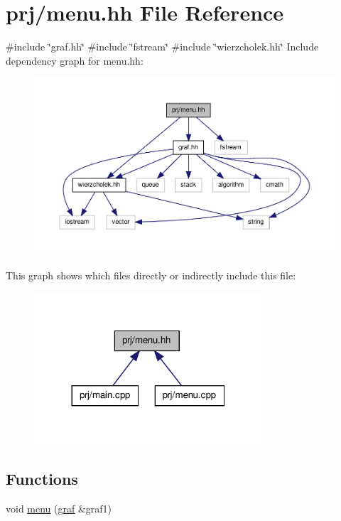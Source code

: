 \hypertarget{menu_8hh}{\section{prj/menu.hh \-File \-Reference}
\label{menu_8hh}
}
{\ttfamily \#include \char`\"{}graf.\-hh\char`\"{}}\*
{\ttfamily \#include \char`\"{}fstream\char`\"{}}\*
{\ttfamily \#include \char`\"{}wierzcholek.\-hh\char`\"{}}\*
\-Include dependency graph for menu.\-hh\-:\nopagebreak
\begin{figure}[H]
\begin{center}
\leavevmode
\includegraphics[width=350pt]{menu_8hh__incl}
\end{center}
\end{figure}
\-This graph shows which files directly or indirectly include this file\-:\nopagebreak
\begin{figure}[H]
\begin{center}
\leavevmode
\includegraphics[width=240pt]{menu_8hh__dep__incl}
\end{center}
\end{figure}
\subsection*{\-Functions}
\begin{DoxyCompactItemize}
\item 
void \hyperlink{menu_8hh_aacc433e415d518c27882997e60a20fe8}{menu} (\hyperlink{classgraf}{graf} \&graf1)
\end{DoxyCompactItemize}


